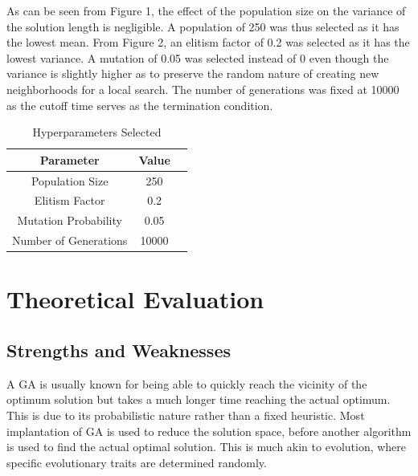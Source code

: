 \documentclass[sigconf]{acmart}
\begin{document}
As can be seen from Figure 1, the effect of the population size on the variance of the solution length is negligible. A population of 250 was thus selected as it has the lowest mean. From Figure 2, an elitism factor of 0.2 was selected as it has the lowest variance. A mutation of 0.05 was selected instead of 0 even though the variance is slightly higher as to preserve the random nature of creating new neighborhoods for a local search. The number of generations was fixed at 10000 as the cutoff time serves as the termination condition.

\begin{table}
  \caption{Hyperparameters Selected}
  \label{tab:freq}
  \begin{tabular}{ccl}
    \toprule
    Parameter&Value\\
    \midrule
    Population Size & 250\\
    Elitism Factor & 0.2\\
    Mutation Probability & 0.05\\
    Number of Generations & 10000\\
  \bottomrule
\end{tabular}
\end{table}

\section{Theoretical Evaluation}
\subsection{Strengths and Weaknesses}
A GA is usually known for being able to quickly reach the vicinity of the optimum solution but takes a much longer time reaching the actual optimum. This is due to its probabilistic nature rather than a fixed heuristic. Most implantation of GA is used to reduce the solution space, before another algorithm is used to find the actual optimal solution. This is much akin to evolution, where specific evolutionary traits are determined randomly.


\end{document}
